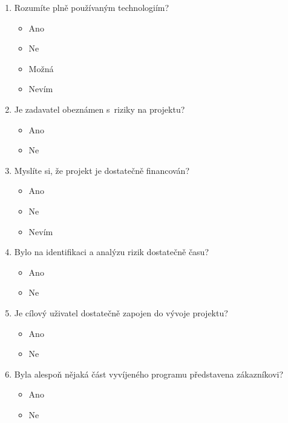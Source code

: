 \begin{enumerate}
    \item Rozumíte plně používaným technologiím? 
    \begin{itemize}
        \item Ano
        \item Ne
        \item Možná
        \item Nevím
    \end{itemize}
    \item Je zadavatel obeznámen s~riziky na projektu? 
        \begin{itemize}
        \item Ano
        \item Ne
    \end{itemize}
    \item Myslíte si, že projekt je dostatečně financován? 
     \begin{itemize}
        \item Ano
        \item Ne
        \item Nevím
    \end{itemize}
    \item Bylo na identifikaci a analýzu rizik dostatečně času? 
     \begin{itemize}
        \item Ano
        \item Ne
    \end{itemize}
    \item Je cílový uživatel dostatečně zapojen do vývoje projektu? 
       \begin{itemize}
        \item Ano
        \item Ne
    \end{itemize}
    \item Byla alespoň nějaká část vyvíjeného programu představena zákazníkovi? 
            \begin{itemize}
        \item Ano
        \item Ne
    \end{itemize}
\end{enumerate}


